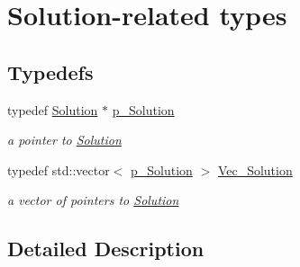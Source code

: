 \hypertarget{group___solution___t_y_p_e_s}{}\section{Solution-\/related types}
\label{group___solution___t_y_p_e_s}
\subsection*{Typedefs}
\begin{DoxyCompactItemize}
\item 
\mbox{\label{group___solution___t_y_p_e_s_gacf92307e1f131aad6b620a78280b747c}} 
typedef \mbox{\hyperlink{class_s_m_spp__di__unipi__it_1_1_solution}{Solution}} $\ast$ \mbox{\hyperlink{group___solution___t_y_p_e_s_gacf92307e1f131aad6b620a78280b747c}{p\+\_\+\+Solution}}
\begin{DoxyCompactList}\small\item\em a pointer to \mbox{\hyperlink{class_s_m_spp__di__unipi__it_1_1_solution}{Solution}} \end{DoxyCompactList}\item 
\mbox{\label{group___solution___t_y_p_e_s_ga904641293a6189c2fd8ecc0ba8cec4c8}} 
typedef std\+::vector$<$ \mbox{\hyperlink{group___solution___t_y_p_e_s_gacf92307e1f131aad6b620a78280b747c}{p\+\_\+\+Solution}} $>$ \mbox{\hyperlink{group___solution___t_y_p_e_s_ga904641293a6189c2fd8ecc0ba8cec4c8}{Vec\+\_\+\+Solution}}
\begin{DoxyCompactList}\small\item\em a vector of pointers to \mbox{\hyperlink{class_s_m_spp__di__unipi__it_1_1_solution}{Solution}} \end{DoxyCompactList}\end{DoxyCompactItemize}


\subsection{Detailed Description}

